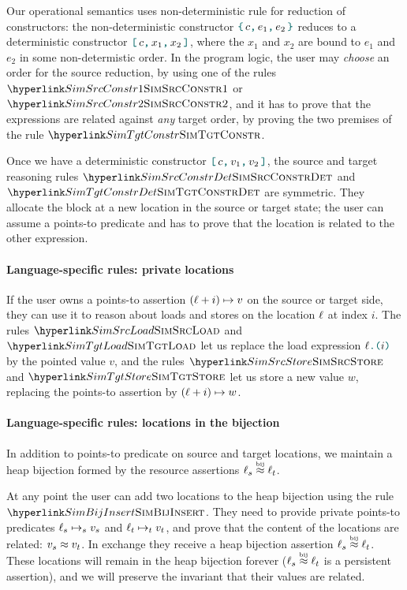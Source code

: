 Our operational semantics uses non-deterministic rule for reduction of constructors: the non-deterministic constructor $\lambdConstr{c}{e_1}{e_2}$ reduces to a deterministic constructor $\lambdConstrDet{c}{x_1}{x_2}$, where the $x_1$ and $x_2$ are bound to $e_1$ and $e_2$ in some non-determistic order.
%
In the program logic, the user may \emph{choose} an order for the source reduction, by using one of the rules $\RefTirName{SimSrcConstr1}$ or $\RefTirName{SimSrcConstr2}$, and it has to prove that the expressions are related against \emph{any} target order, by proving the two premises of the rule $\RefTirName{SimTgtConstr}$.

Once we have a deterministic constructor $\lambdConstrDet{c}{v_1}{v_2}$, the source and target reasoning rules $\RefTirName{SimSrcConstrDet}$ and $\RefTirName{SimTgtConstrDet}$ are symmetric.
%
They allocate the block at a new location in the source or target state; the user can assume a points-to predicate and has to prove that the location is related to the other expression.

\paragraph{Language-specific rules: private locations}
%
If the user owns a points-to assertion $(\ell + i) \mapsto v$ on the source or target side, they can use it to reason about loads and stores on the location $\ell$ at index $i$. The rules $\RefTirName{SimSrcLoad}$ and $\RefTirName{SimTgtLoad}$ let us replace the load expression $\lambdLoad{\loc}{i}$ by the pointed value $v$, and the rules $\RefTirName{SimSrcStore}$ and $\RefTirName{SimTgtStore}$ let us store a new value $w$, replacing the points-to assertion by $(\ell + i) \mapsto w$.

\paragraph{Language-specific rules: locations in the bijection}
%
In addition to points-to predicate on source and target locations, we maintain a heap bijection formed by the resource assertions $\ell_s \stackrel{\scriptscriptstyle\textrm{bij}}{\approx} \ell_t$.

At any point the user can add two locations to the heap bijection using the rule $\RefTirName{SimBijInsert}$. They need to provide private points-to predicates $\ell_s \mapsto_s v_s$ and $\ell_t \mapsto_t v_t$, and prove that the content of the locations are related: $v_s \approx v_t$.
%
In exchange they receive a heap bijection assertion $\ell_s \stackrel{\scriptscriptstyle\textrm{bij}}{\approx} \ell_t$. These locations will remain in the heap bijection forever ($\ell_s \stackrel{\scriptscriptstyle\textrm{bij}}{\approx} \ell_t$ is a persistent assertion), and we will preserve the invariant that their values are related.

